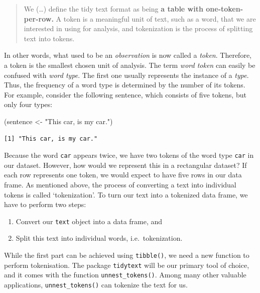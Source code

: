 \documentclass[
  letterpaper,
  DIV=11,
  numbers=noendperiod]{scrreprt}
\newenvironment{Shaded}{\begin{snugshade}}{\end{snugshade}}
\newcommand{\NormalTok}[1]{\textcolor[rgb]{0.00,0.23,0.31}{#1}}
\newcommand{\OtherTok}[1]{\textcolor[rgb]{0.00,0.23,0.31}{#1}}
\newcommand{\StringTok}[1]{\textcolor[rgb]{0.13,0.47,0.30}{#1}}
\providecommand{\tightlist}{%
  \setlength{\itemsep}{0pt}\setlength{\parskip}{0pt}}\usepackage{longtable,booktabs,array}
\begin{document}
\begin{quote}
We (\ldots) define the tidy text format as being \textbf{a table with
one-token-per-row.} A token is a meaningful unit of text, such as a
word, that we are interested in using for analysis, and tokenization is
the process of splitting text into tokens.
\end{quote}

In other words, what used to be an \emph{observation} is now called a
\emph{token}. Therefore, a token is the smallest chosen unit of
analysis. The term \emph{word token} can easily be confused with
\emph{word type}. The first one usually represents the instance of a
\emph{type}. Thus, the frequency of a word type is determined by the
number of its tokens. For example, consider the following sentence,
which consists of five tokens, but only four types:

\begin{Shaded}
\begin{Highlighting}[]
\NormalTok{(sentence }\OtherTok{\textless{}{-}} \StringTok{"This car, is my car."}\NormalTok{)}
\end{Highlighting}
\end{Shaded}

\begin{verbatim}
[1] "This car, is my car."
\end{verbatim}

Because the word \texttt{car} appears twice, we have two tokens of the
word type \texttt{car} in our dataset. However, how would we represent
this in a rectangular dataset? If each row represents one token, we
would expect to have five rows in our data frame. As mentioned above,
the process of converting a text into individual tokens is called
`tokenization'. To turn our text into a tokenized data frame, we have to
perform two steps:

\begin{enumerate}
\def\labelenumi{\arabic{enumi}.}
\tightlist
\item
  Convert our \texttt{text} object into a data frame, and
\item
  Split this text into individual words, i.e.~tokenization.
\end{enumerate}

While the first part can be achieved using \texttt{tibble()}, we need a
new function to perform tokenisation. The package \texttt{tidytext} will
be our primary tool of choice, and it comes with the function
\texttt{unnest\_tokens()}. Among many other valuable applications,
\texttt{unnest\_tokens()} can tokenize the text for us.
\end{document}
